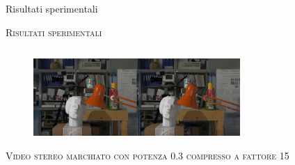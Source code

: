 \documentclass{beamer}
\begin{document}
\begin{section}{Risultati sperimentali}
\begin{frame}[t]{\textsc{Risultati sperimentali}}
\begin{columns}
\begin{column}{5cm}
\end{column}
\end{columns}
\vspace{2mm}
\begin{figure}
  \includegraphics[width=0.7\textwidth]{./img_wat/marked_03_DFT.jpg}  
  \caption{} 
  \label{fig:mg1}
\end{figure}
\end{frame}



\begin{frame}[t]{\textsc{Video stereo marchiato con potenza 0.3 compresso a fattore 15
}}
\vspace{2mm}
\begin{center}
\end{center}

\end{frame}
\end{section}
\end{document}
